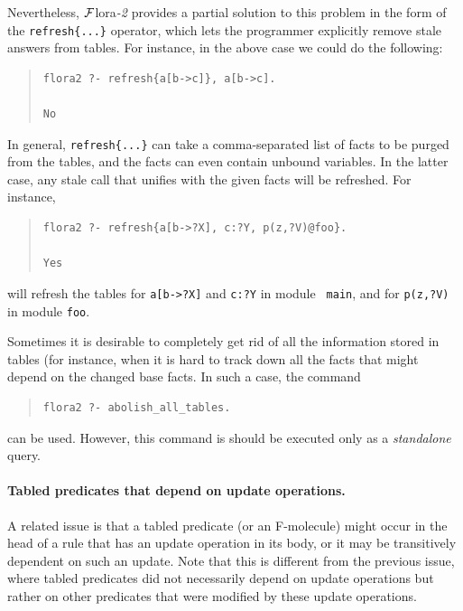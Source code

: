 \documentclass[11pt]{article}
\newcommand{\FLORA}{{\mbox{\sc ${\cal F}${lora}\rm\emph{-2}}}\xspace}
\begin{document}
Nevertheless, \FLORA provides a partial solution to this problem in the form
of the {\tt refresh\{...\}} operator, which lets the programmer explicitly
remove stale answers from tables. For instance, in the above case we could
do the following:
\begin{quote}
\begin{verbatim}
flora2 ?- refresh{a[b->c]}, a[b->c].

No
\end{verbatim}
\end{quote}
In general, {\tt refresh\{...\}} can take a comma-separated list of facts to
be purged from the tables, and the facts can even contain unbound variables.
In the latter case, any stale call that unifies with the given facts will
be refreshed. For instance,
\begin{quote}
\begin{verbatim}
flora2 ?- refresh{a[b->?X], c:?Y, p(z,?V)@foo}.

Yes
\end{verbatim}
\end{quote}
will refresh the tables for {\tt a[b->?X]} and {\tt c:?Y} in module {\tt
  main}, and for {\tt p(z,?V)} in module {\tt foo}.

Sometimes it is desirable to completely get rid of all the information
stored in tables (for instance, when it is hard to track down all the facts
that might depend on the changed base facts. In such a case, the command
\begin{quote}
\begin{verbatim}
flora2 ?- abolish_all_tables.
\end{verbatim}
\end{quote}
can be used. However, this command is should be executed only as
a \emph{standalone} query.



\paragraph{Tabled predicates that depend on update operations.}
\label{page-depchk}
A related issue is that a tabled predicate (or an F-molecule)
might occur in the head of a rule that has an update operation in its body,
or it may be transitively dependent on such an update. Note that this is
different from the previous issue, where tabled predicates did not
necessarily depend on update operations but rather on other predicates that
were modified by these update operations.
\end{document}
